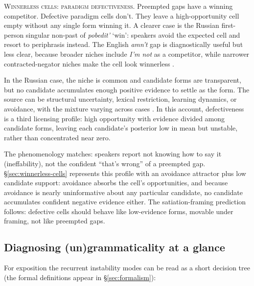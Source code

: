 \documentclass[12pt,letterpaper]{article}
\newcommand{\mention}[1]{\textit{#1}}
\newcommand{\olang}[1]{\textit{#1}}
\begin{document}
\noindent\textsc{Winnerless cells: paradigm defectiveness.} Preempted gaps have a winning competitor. Defective paradigm
cells don't. They leave a high-opportunity cell empty without any single form
winning it. A clearer case is the Russian first-person singular non-past of
\olang{pobedit'} `win': speakers avoid the expected cell and resort to
periphrasis instead. The English \mention{amn't} gap is diagnostically useful but
less clear, because broader niches include \mention{I'm not} as a competitor,
while narrower contracted-negator niches make the cell look winnerless
\citep{Broadbent2009Amnt,ThomsEtAl2025Amnt,Sims2023Defectiveness,
Pertsova2016RussianGaps,PertsovaKuznetsova2015Russian}.

In the Russian case, the niche is common and candidate forms are transparent, but no candidate
accumulates enough positive evidence to settle as the form. The source can be
structural uncertainty, lexical restriction, learning dynamics, or avoidance,
with the mixture varying across cases \citep{Sims2023Defectiveness}. In this
account, defectiveness is a third licensing profile: high opportunity with
evidence divided among candidate forms, leaving each candidate's posterior low
in mean but unstable, rather than concentrated near zero.

The phenomenology matches: speakers report not knowing how to say it
(ineffability), not the confident \enquote{that's wrong} of a preempted gap.
\S\ref{sec:winnerless-cells} represents this profile with an avoidance
attractor plus low candidate support: avoidance absorbs the cell's opportunities,
and because avoidance is nearly uninformative about any particular candidate, no
candidate accumulates confident negative evidence either. The satiation-framing
prediction follows: defective cells should behave like low-evidence forms,
movable under framing, not like preempted gaps.

\subsection{Diagnosing (un)grammaticality at a glance}
\label{sec:diag-tree}

For exposition the recurrent instability modes can be read as a short decision tree (the formal definitions appear in \S\ref{sec:formalism}):
\end{document}
